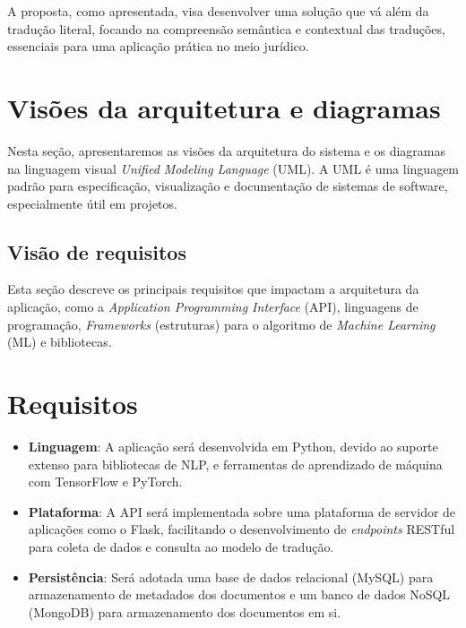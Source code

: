A proposta, como apresentada, visa desenvolver uma solução que vá além da tradução literal, focando na compreensão semântica e contextual das traduções, essenciais para uma aplicação prática no meio jurídico.

\section{Visões da arquitetura e diagramas}

Nesta seção, apresentaremos as visões da arquitetura do sistema e os diagramas na linguagem visual \textit{Unified Modeling Language} (UML). A UML é uma linguagem padrão para especificação, visualização e documentação de sistemas de software, especialmente útil em projetos.

\subsection{Visão de requisitos}

Esta seção descreve os principais requisitos que impactam a arquitetura da aplicação, como a \textit{Application Programming Interface} (API), linguagens de programação, \textit{Frameworks} (estruturas) para o algoritmo de \textit{Machine Learning} (ML) e bibliotecas.

\section*{Requisitos}

\begin{itemize}
    \item \textbf{Linguagem}: A aplicação será desenvolvida em Python, devido ao suporte extenso para bibliotecas de NLP, e ferramentas de aprendizado de máquina com TensorFlow e PyTorch.
    \item \textbf{Plataforma}: A API será implementada sobre uma plataforma de servidor de aplicações como o Flask, facilitando o desenvolvimento de \textit{endpoints} RESTful para coleta de dados e consulta ao modelo de tradução.
    \item \textbf{Persistência}: Será adotada uma base de dados relacional (MySQL) para armazenamento de metadados dos documentos e um banco de dados NoSQL (MongoDB) para armazenamento dos documentos em si.
\end{itemize}



